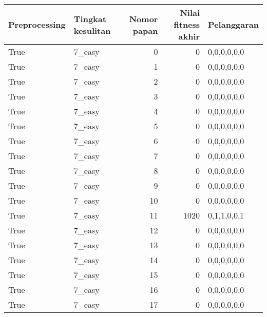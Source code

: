 \begin{tabular}{llrrl}
\hline
 Preprocessing   & Tingkat kesulitan   &   Nomor papan &   Nilai fitness akhir & Pelanggaran   \\
\hline
 True            & 7\_easy              &             0 &                     0 & 0,0,0,0,0,0   \\
 True            & 7\_easy              &             1 &                     0 & 0,0,0,0,0,0   \\
 True            & 7\_easy              &             2 &                     0 & 0,0,0,0,0,0   \\
 True            & 7\_easy              &             3 &                     0 & 0,0,0,0,0,0   \\
 True            & 7\_easy              &             4 &                     0 & 0,0,0,0,0,0   \\
 True            & 7\_easy              &             5 &                     0 & 0,0,0,0,0,0   \\
 True            & 7\_easy              &             6 &                     0 & 0,0,0,0,0,0   \\
 True            & 7\_easy              &             7 &                     0 & 0,0,0,0,0,0   \\
 True            & 7\_easy              &             8 &                     0 & 0,0,0,0,0,0   \\
 True            & 7\_easy              &             9 &                     0 & 0,0,0,0,0,0   \\
 True            & 7\_easy              &            10 &                     0 & 0,0,0,0,0,0   \\
 True            & 7\_easy              &            11 &                  1020 & 0,1,1,0,0,1   \\
 True            & 7\_easy              &            12 &                     0 & 0,0,0,0,0,0   \\
 True            & 7\_easy              &            13 &                     0 & 0,0,0,0,0,0   \\
 True            & 7\_easy              &            14 &                     0 & 0,0,0,0,0,0   \\
 True            & 7\_easy              &            15 &                     0 & 0,0,0,0,0,0   \\
 True            & 7\_easy              &            16 &                     0 & 0,0,0,0,0,0   \\
 True            & 7\_easy              &            17 &                     0 & 0,0,0,0,0,0   \\

\end{tabular}

